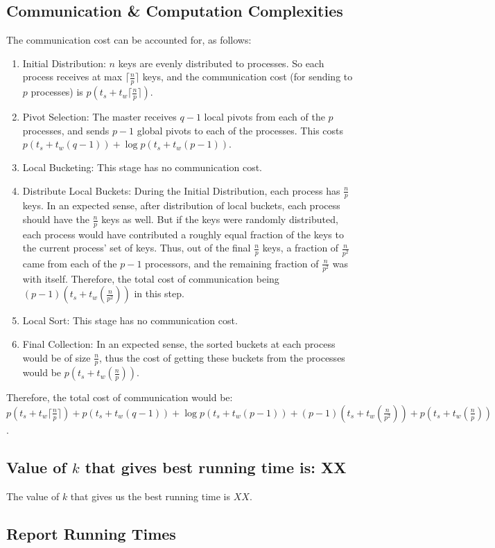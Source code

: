 \documentclass{article}
\begin{document}
\subsection{Communication \& Computation Complexities}
The communication cost can be accounted for, as follows:
\begin{enumerate}
\item Initial Distribution: $n$ keys are evenly distributed to processes. So each process
receives at max $\lceil\frac{n}{p}\rceil$ keys, and the communication cost (for sending to $p$ processes) is
$p(t_s + t_w\lceil\frac{n}{p}\rceil)$.
\item Pivot Selection: The master receives $q-1$ local pivots from each of the $p$ processes, 
and sends $p-1$ global pivots to each of the processes. This costs $p(t_s + t_w(q-1)) + 
\log{p}(t_s + t_w(p-1))$.
\item Local Bucketing: This stage has no communication cost.
\item Distribute Local Buckets: During the Initial Distribution, each process has $\frac{n}{p}$
keys. In an expected sense, after distribution of local buckets, each process should have 
the $\frac{n}{p}$ keys as well. But if the keys were randomly distributed, each process would have
contributed a roughly equal fraction of the keys to the current process' set of keys. Thus, out of
the final $\frac{n}{p}$ keys, a fraction of $\frac{n}{p^2}$ came from each of the $p-1$ processors,
and the remaining fraction of $\frac{n}{p^2}$ was with itself. Therefore, the total cost of 
communication being $(p-1)(t_s + t_w(\frac{n}{p^2}))$ in this step.
\item Local Sort: This stage has no communication cost.
\item Final Collection: In an expected sense, the sorted buckets at each process would be of size
$\frac{n}{p}$, thus the cost of getting these buckets from the processes would be
$p(t_s + t_w(\frac{n}{p}))$.
\end{enumerate}
Therefore, the total cost of communication would be: $p(t_s + t_w\lceil\frac{n}{p}\rceil) + p(t_s + t_w(q-1)) + 
\log{p}(t_s + t_w(p-1)) + (p-1)(t_s + t_w(\frac{n}{p^2})) + p(t_s + t_w(\frac{n}{p}))$.

\subsection{Value of $k$ that gives best running time is: XX}

The value of $k$ that gives us the best running time is $XX$.

\subsection{Report Running Times}
\end{document}
